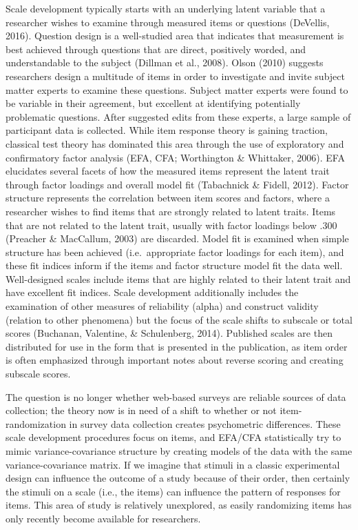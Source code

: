 \documentclass[english,man, mask]{apa6}
\theoremstyle{definition}
\theoremstyle{definition}
\theoremstyle{definition}
\theoremstyle{remark}
\begin{document}
Scale development typically starts with an underlying latent variable
that a researcher wishes to examine through measured items or questions
(DeVellis, 2016). Question design is a well-studied area that indicates
that measurement is best achieved through questions that are direct,
positively worded, and understandable to the subject (Dillman et al.,
2008). Olson (2010) suggests researchers design a multitude of items in
order to investigate and invite subject matter experts to examine these
questions. Subject matter experts were found to be variable in their
agreement, but excellent at identifying potentially problematic
questions. After suggested edits from these experts, a large sample of
participant data is collected. While item response theory is gaining
traction, classical test theory has dominated this area through the use
of exploratory and confirmatory factor analysis (EFA, CFA; Worthington
\& Whittaker, 2006). EFA elucidates several facets of how the measured
items represent the latent trait through factor loadings and overall
model fit (Tabachnick \& Fidell, 2012). Factor structure represents the
correlation between item scores and factors, where a researcher wishes
to find items that are strongly related to latent traits. Items that are
not related to the latent trait, usually with factor loadings below .300
(Preacher \& MacCallum, 2003) are discarded. Model fit is examined when
simple structure has been achieved (i.e.~appropriate factor loadings for
each item), and these fit indices inform if the items and factor
structure model fit the data well. Well-designed scales include items
that are highly related to their latent trait and have excellent fit
indices. Scale development additionally includes the examination of
other measures of reliability (alpha) and construct validity (relation
to other phenomena) but the focus of the scale shifts to subscale or
total scores (Buchanan, Valentine, \& Schulenberg, 2014). Published
scales are then distributed for use in the form that is presented in the
publication, as item order is often emphasized through important notes
about reverse scoring and creating subscale scores.

The question is no longer whether web-based surveys are reliable sources
of data collection; the theory now is in need of a shift to whether or
not item-randomization in survey data collection creates psychometric
differences. These scale development procedures focus on items, and
EFA/CFA statistically try to mimic variance-covariance structure by
creating models of the data with the same variance-covariance matrix. If
we imagine that stimuli in a classic experimental design can influence
the outcome of a study because of their order, then certainly the
stimuli on a scale (i.e., the items) can influence the pattern of
responses for items. This area of study is relatively unexplored, as
easily randomizing items has only recently become available for
researchers.
\end{document}
